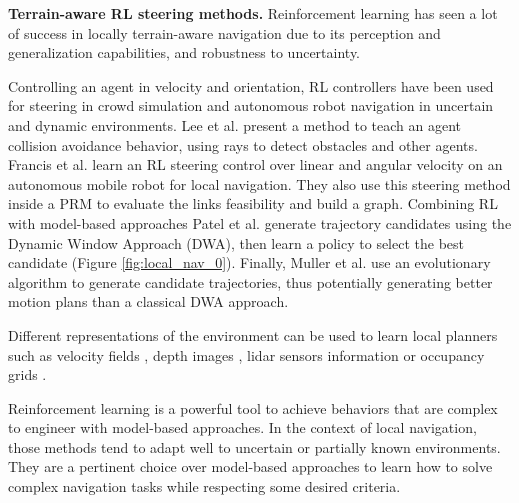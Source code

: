 \noindent\textbf{Terrain-aware RL steering methods.}
Reinforcement learning has seen a lot of success in locally terrain-aware navigation due to its perception and generalization capabilities, and robustness to uncertainty.

Controlling an agent in velocity and orientation, RL controllers have been used for steering in crowd simulation \cite{survey_rl_animation_pettre_2022} and autonomous robot navigation \cite{collision_avoidance_rl_multiagent_chen_2016, survey_rl_driving_kiran_2020} in uncertain and dynamic environments.
Lee et al. \cite{jaedong_2018_crowd_rl} present a method to teach an agent collision avoidance behavior, using rays to detect obstacles and other agents.
Francis et al. \cite{prm_rl_2019} learn an RL steering control over linear and angular velocity on an autonomous mobile robot for local navigation. They also use this steering method inside a PRM to evaluate the links feasibility and build a graph.
Combining RL with model-based approaches Patel et al. \cite{patel_dwa_rl_2021} generate trajectory candidates using the Dynamic Window Approach (DWA), then learn a policy to select the best candidate (Figure \ref{fig:local_nav_0}).
Finally, Muller et al. \cite{dwa_gan} use an evolutionary algorithm to generate candidate trajectories, thus potentially generating better motion plans than a classical DWA approach.

Different representations of the environment can be used to learn local planners such as velocity fields \cite{deep_multiagent_crowd_2020}, depth images \cite{learn_steer_2018}, lidar sensors information \cite{prm_rl_2019, RL_RRT} or occupancy grids \cite{rl_navigation_video_game_2020}.

Reinforcement learning is a powerful tool to achieve behaviors that are complex to engineer with model-based approaches.
In the context of local navigation, those methods tend to adapt well to uncertain or partially known environments.
They are a pertinent choice over model-based approaches to learn how to solve complex navigation tasks while respecting some desired criteria.\\


